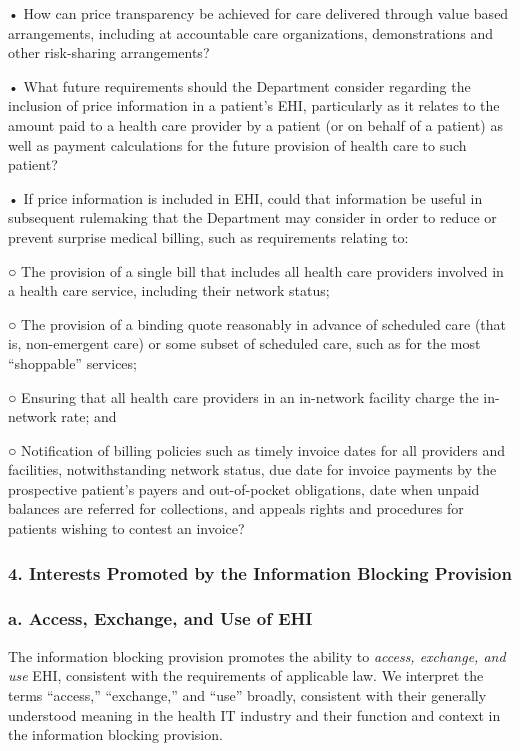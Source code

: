 \documentclass[twoside,11pt]{article}
\begin{document}
          • How can price transparency be achieved for care delivered through value based arrangements, including at accountable care organizations, demonstrations and other risk-sharing arrangements?


          • What future requirements should the Department consider regarding the inclusion of price information in a patient's EHI, particularly as it relates to the amount paid to a health care provider by a patient (or on behalf of a patient) as well as payment calculations for the future provision of health care to such patient?


          • If price information is included in EHI, could that information be useful in subsequent rulemaking that the Department may consider in order to reduce or prevent surprise medical billing, such as requirements relating to:


          ○ The provision of a single bill that includes all health care providers involved in a health care service, including their network status;


          ○ The provision of a binding quote reasonably in advance of scheduled care (that is, non-emergent care) or some subset of scheduled care, such as for the most “shoppable” services;


          ○ Ensuring that all health care providers in an in-network facility charge the in-network rate; and


          ○ Notification of billing policies such as timely invoice dates for all providers and facilities, notwithstanding network status, due date for invoice payments by the prospective patient's payers and out-of-pocket obligations, date when unpaid balances are referred for collections, and appeals rights and procedures for patients wishing to contest an invoice?


          \subsubsection{4. Interests Promoted by the Information Blocking Provision}

          \subsubsection{a. Access, Exchange, and Use of EHI}


          The information blocking provision promotes the ability to \emph{access, exchange, and use} EHI, consistent with the requirements of applicable law. We interpret the terms “access,” “exchange,” and “use” broadly, consistent with their generally understood meaning in the health IT industry and their function and context in the information blocking provision.
\end{document}
